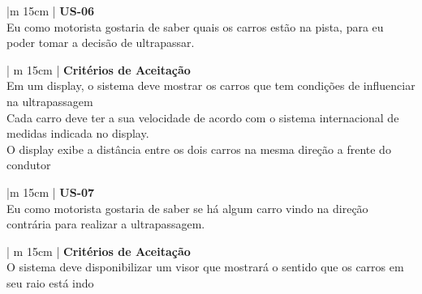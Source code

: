 \begin{table}[ht]
\caption{User Store - 06}
\centering
\begin{tabular}{|m {15cm} |}
\hline
\textbf{US-06} \\
\hline
Eu como motorista gostaria de saber quais os carros estão na pista, para eu poder tomar a decisão de ultrapassar. \\
\hline
\end{tabular}
\label{table:us03}
\end{table}

\begin{table}[ht]
\caption{Critérios de Aceitaração para User Store - 06}
\centering
\begin{tabular}{| m {15cm} |}
\hline
\textbf{Critérios de Aceitação} \\
\hline
Em um display, o sistema deve mostrar os carros que tem condições de influenciar na ultrapassagem\\
\hline
Cada carro deve ter a sua velocidade de acordo com o sistema internacional de medidas indicada no display.\\
\hline
O display exibe a distância entre os dois carros na mesma direção a frente do condutor\\
\hline
\end{tabular}
\label{table:cus01}
\end{table}


\begin{table}[ht]
\caption{User Store - 07}
\centering
\begin{tabular}{|m {15cm} |}
\hline
\textbf{US-07} \\
\hline
Eu como motorista gostaria de saber se há algum carro vindo na direção contrária para realizar a ultrapassagem. \\
\hline
\end{tabular}
\label{table:us03}
\end{table}

\begin{table}[ht]
\caption{Critérios de Aceitaração para User Store - 07}
\centering
\begin{tabular}{| m {15cm} |}
\hline
\textbf{Critérios de Aceitação} \\
\hline
O sistema deve disponibilizar um visor que mostrará o sentido que os carros em seu raio está indo \\
\hline
\end{tabular}
\label{table:cus01}
\end{table}


